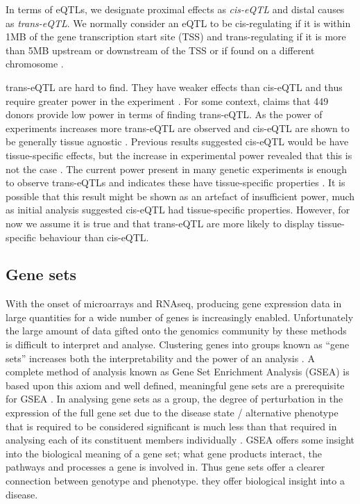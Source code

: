 \documentclass[11pt]{article} %
\begin{document}
	In terms of eQTLs, we designate proximal effects as \emph{cis-eQTL} and distal causes as 
	\emph{trans-eQTL}. We normally consider an eQTL to be cis-regulating if it is within 1MB of the 
	gene transcription start site (TSS) and trans-regulating if it is more than 5MB upstream or 
	downstream of the TSS or if found on a different chromosome \cite{nica_expression_2013}.
	
	trans-eQTL are hard to find. They have weaker effects than cis-eQTL and thus require greater power 
	in the experiment \cite{dixon_genome-wide_2007}. For some context, \citet{burgess_gene_2017} claims 
	that 449 donors provide low power in terms of finding trans-eQTL. As the power of experiments increases 
	more trans-eQTL are observed and cis-eQTL are shown to be generally tissue agnostic 
	\cite{gtex_consortium_genetic_2017}. Previous results suggested cis-eQTL would be have tissue-specific effects, 
	but the increase in experimental power revealed that this is not the case \cite{grundberg_mapping_2012}. 
	The current power present in many genetic experiments is enough to observe trans-eQTLs and indicates 
	these have tissue-specific properties \cite{grundberg_mapping_2012}\cite{gtex_consortium_genetic_2017}. It is possible that this result might be shown as an artefact of insufficient power, much as initial analysis suggested cis-eQTL had tissue-specific properties. However, for now we assume it is true and that trans-eQTL are more likely to display tissue-specific behaviour 
	than cis-eQTL.
	
	\subsection{Gene sets}
	With the onset of microarrays and RNAseq, producing gene expression data in large quantities for a wide number of genes is increasingly enabled. Unfortunately the large amount of data gifted onto the genomics community by these methods is difficult to interpret and analyse. Clustering genes into groups known as ``gene sets'' increases both the interpretability and the power of an analysis \cite{nica_expression_2013}\cite{vosa_unraveling_2018}. A complete method of analysis known as Gene Set Enrichment Analysis (GSEA) is based upon this axiom \cite{subramanian_gene_2005} and well defined, meaningful gene sets are a prerequisite for GSEA \cite{mooney_gene_2015}. In analysing gene sets as a group, the degree of perturbation in the expression of the full gene set due to the disease state / alternative phenotype that is required to be considered significant is much less than that required in analysing each of its constituent members individually \cite{dudbridge_power_2013}\cite{wray_research_2014}. GSEA offers some insight into the biological meaning of a gene set; what gene products interact, the pathways and processes a gene is involved in. Thus gene sets offer a clearer connection between genotype and phenotype. they offer biological insight into a disease.
	
\end{document}
